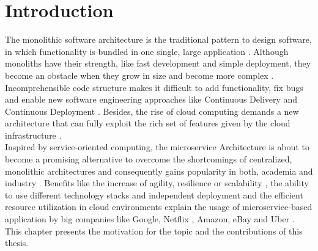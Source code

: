 
\chapter{Introduction}
\label{ch:Introduction}
The monolithic software architecture is the traditional pattern to design software, in which functionality is bundled in one single, large application \cite{DataflowDrivenChen}. Although monoliths have their strength, like fast development and simple deployment, they become an obstacle when they grow in size and become more complex \cite{infoq}. Incomprehensible code structure makes it difficult to add functionality, fix bugs and enable new software engineering approaches like Continuous Delivery and Continuous Deployment \cite{cd}. 
Besides, the rise of cloud computing demands a new architecture that can fully exploit the rich set of features given by the cloud infrastructure \cite{MigratingCloud}. \\
Inspired by service-oriented computing, the microservice Architecture is about to become a promising alternative to overcome the shortcomings of centralized, monolithic architectures and consequently gains popularity in both, academia and industry \cite{ObjectAwareAmiri}. Benefits like the increase of agility, resilience or scalability \cite{FunctionalDecompositionHeinrich}, the ability to use different technology stacks and independent deployment \cite{interfaceAnalysisBaresi} and the efficient resource utilization in cloud environments \cite{MigratingCloud} explain the usage of microservice-based application by big companies like Google, Netflix \cite{DevOps}, Amazon, eBay \cite{DataflowDrivenChen} and Uber \cite{FunctionalDecompositionHeinrich}. \\
This chapter presents the motivation for the topic and the contributions of this thesis.


